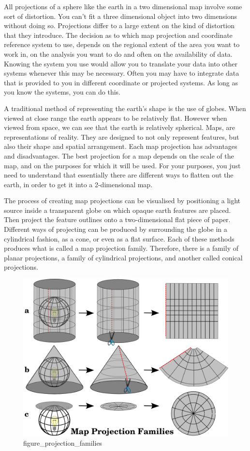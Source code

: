 \documentclass[
]{book}
\begin{document}
All projections of a sphere like the earth in a two dimensional map involve some sort of distortion. You can't fit a three dimensional object into two dimensions without doing so. Projections differ to a large extent on the kind of distortion that they introduce. The decision as to which map projection and coordinate reference system to use, depends on the regional extent of the area you want to work in, on the analysis you want to do and often on the availability of data. Knowing the system you use would allow you to translate your data into other systems whenever this may be necessary. Often you may have to integrate data that is provided to you in different coordinate or projected systems. As long as you know the systems, you can do this.

A traditional method of representing the earth's shape is the use of globes. When viewed at close range the earth appears to be relatively flat. However when viewed from space, we can see that the earth is relatively spherical. Maps, are representations of reality. They are designed to not only represent features, but also their shape and spatial arrangement. Each map projection has advantages and disadvantages. The best projection for a map depends on the scale of the map, and on the purposes for which it will be used. For your purposes, you just need to understand that essentially there are different ways to flatten out the earth, in order to get it into a 2-dimensional map.

The process of creating map projections can be visualised by positioning a light source inside a transparent globe on which opaque earth features are placed. Then project the feature outlines onto a two-dimensional flat piece of paper. Different ways of projecting can be produced by surrounding the globe in a cylindrical fashion, as a cone, or even as a flat surface. Each of these methods produces what is called a map projection family. Therefore, there is a family of planar projections, a family of cylindrical projections, and another called conical projections.

\begin{figure}
\centering
\includegraphics{img/projection_families.png}
\caption{figure\_projection\_families}
\end{figure}
\end{document}
